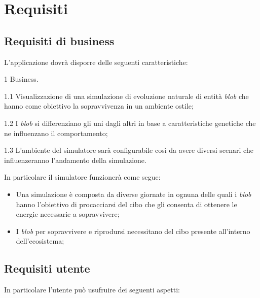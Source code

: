 \chapter{Requisiti}

\section{Requisiti di business}

L'applicazione dovrà disporre delle seguenti caratteristiche:
\begin{myEnumerate}
    \item[1] Business.
    \begin{myEnumerate}[label*=\arabic*.]
        \item[1.1] Visualizzazione di una simulazione di evoluzione naturale di entità \textit{blob} che hanno come obiettivo la sopravvivenza in un ambiente ostile;
        \item[1.2] I \textit{blob} si differenziano gli uni dagli altri in base a caratteristiche genetiche che ne influenzano il comportamento;
        \item[1.3] L'ambiente del simulatore sarà configurabile così da avere diversi scenari che influenzeranno l'andamento della simulazione.
    \end{myEnumerate}
\end{myEnumerate}

In particolare il simulatore funzionerà come segue:
\begin{itemize}
    \item Una simulazione è composta da diverse giornate in ognuna delle quali i \textit{blob} hanno l'obiettivo di procacciarsi del cibo che gli consenta di ottenere le energie necessarie a sopravvivere;
    \item I \textit{blob} per sopravvivere e riprodursi necessitano del cibo presente all'interno dell'ecosistema;
\end{itemize}

\section{Requisiti utente}
In particolare l'utente può usufruire dei seguenti aspetti:

